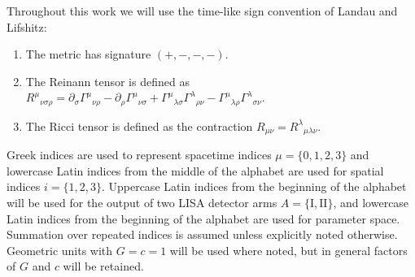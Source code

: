 Throughout this work we will use the time-like sign convention of Landau and Lifshitz\cite{Landau1975}:
\begin{enumerate}
\item The metric has signature $(+,-,-,-)$.
\item The Reinann tensor is defined as ${R^\mu}_{\nu\sigma\rho} = \partial_\sigma {\Gamma^\mu}_{\nu\rho} - \partial_\rho {\Gamma^\mu}_{\nu\sigma} + {\Gamma^\mu}_{\lambda\sigma}{\Gamma^\lambda}_{\rho\nu} - {\Gamma^\mu}_{\lambda\rho}{\Gamma^\lambda}_{\sigma\nu}$.
\item The Ricci tensor is defined as the contraction $R_{\mu\nu} = {R^\lambda}_{\mu\lambda\nu}$.
\end{enumerate}
Greek indices are used to represent spacetime indices $\mu = \{0,1,2,3\}$ and lowercase Latin indices from the middle of the alphabet are used for spatial indices $i = \{1,2,3\}$. Uppercase Latin indices from the beginning of the alphabet will be used for the output of two LISA detector arms $A = \{\mathrm{I}, \mathrm{II}\}$, and lowercase Latin indices from the beginning of the alphabet are used for parameter space. Summation over repeated indices is assumed unless explicitly noted otherwise. Geometric units with $G = c = 1$ will be used where noted, but in general factors of $G$ and $c$ will be retained.
